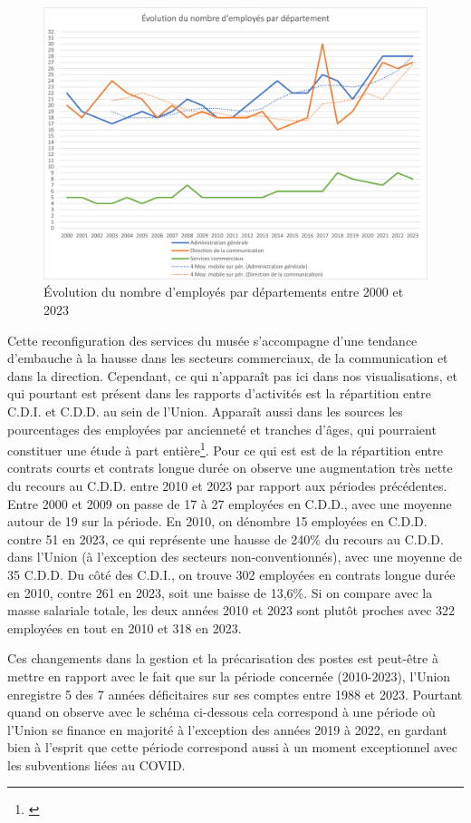 \pagebreak

\begin{figure}[H]
    \centering
    \includegraphics[width=0.75\linewidth]{Illustrations/Image12.png}
    \caption{Évolution du nombre d'employés par départements entre 2000 et 2023}
    \label{fig:placeholder}
\end{figure}

Cette reconfiguration des services du musée s'accompagne d'une tendance d'embauche à la hausse dans les secteurs commerciaux, de la communication et dans la direction. Cependant, ce qui n'apparaît pas ici dans nos visualisations, et qui pourtant est présent dans les rapports d'activités est la répartition entre C.D.I. et C.D.D. au sein de l'Union. Apparaît aussi dans les sources les pourcentages des employé\wokisme e\wokisme s par ancienneté et tranches d'âges, qui pourraient constituer une étude à part entière\footnote{\cite{noauthor__1982}}. Pour ce qui est est de la répartition entre contrats courts et contrats longue durée on observe une augmentation très nette du recours au C.D.D. entre 2010 et 2023 par rapport aux périodes précédentes. Entre 2000 et 2009 on passe de 17 à 27 employé\wokisme e\wokisme s en C.D.D., avec une moyenne autour de 19 sur la période. En 2010, on dénombre 15 employé\wokisme e\wokisme s en C.D.D. contre 51 en 2023, ce qui représente une hausse de 240\% du recours au C.D.D. dans l'Union (à l'exception des secteurs non-conventionnés), avec une moyenne de 35 C.D.D. Du côté des C.D.I., on trouve 302 employé\wokisme e\wokisme s en contrats longue durée en 2010, contre 261 en 2023, soit une baisse de 13,6\%. Si on compare avec la masse salariale totale, les deux années 2010 et 2023 sont plutôt proches avec 322 employé\wokisme e\wokisme s en tout en 2010 et 318 en 2023. 

Ces changements dans la gestion et la précarisation des postes est peut-être à mettre en rapport avec le fait que sur la période concernée (2010-2023), l'Union enregistre 5 des 7 années déficitaires sur ses comptes entre 1988 et 2023. Pourtant quand on observe avec le schéma ci-dessous cela correspond à une période où l'Union se finance en majorité à l'exception des années 2019 à 2022, en gardant bien à l'esprit que cette période correspond aussi à un moment exceptionnel avec les subventions liées au COVID. 

